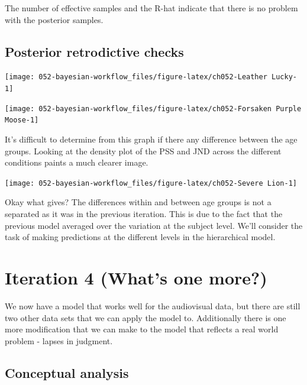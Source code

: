 \documentclass[11pt, oneside, openany]{scrbook}
\begin{document}
The number of effective samples and the R-hat indicate that there is no problem with the posterior samples.

\hypertarget{iter3-post-retro}{%
\subsection{Posterior retrodictive checks}\label{iter3-post-retro}}

\begin{center}\texttt{[image: 052-bayesian-workflow\_files/figure-latex/ch052-Leather Lucky-1]} \end{center}

\begin{center}\texttt{[image: 052-bayesian-workflow\_files/figure-latex/ch052-Forsaken Purple Moose-1]} \end{center}

It's difficult to determine from this graph if there any difference between the age groups. Looking at the density plot of the PSS and JND across the different conditions paints a much clearer image.

\begin{center}\texttt{[image: 052-bayesian-workflow\_files/figure-latex/ch052-Severe Lion-1]} \end{center}

Okay what gives? The differences within and between age groups is not a separated as it was in the previous iteration. This is due to the fact that the previous model averaged over the variation at the subject level. We'll consider the task of making predictions at the different levels in the hierarchical model.

\hypertarget{iter4}{%
\section{Iteration 4 (What's one more?)}\label{iter4}}

We now have a model that works well for the audiovisual data, but there are still two other data sets that we can apply the model to. Additionally there is one more modification that we can make to the model that reflects a real world problem - lapses in judgment.

\hypertarget{iter4-conceptual}{%
\subsection{Conceptual analysis}\label{iter4-conceptual}}
\end{document}
